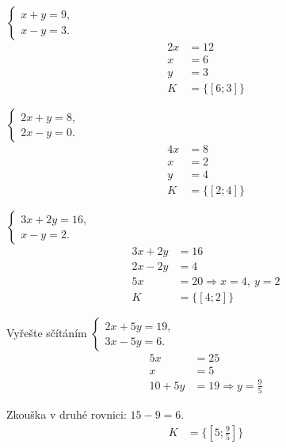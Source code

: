\documentclass[11pt,a4paper]{article}
\begin{document}
\begin{zadaniReseniBox}[title={Samostatná práce 1}]
$\begin{cases}x+y=9,\\x-y=3.\end{cases}$
\tcblower
\[
\begin{aligned}
2x&=12 \\
 x&=6 \\
 y&=3 \\[2mm]
K &= \{[6;3]\}
\end{aligned}
\]
\end{zadaniReseniBox}
\begin{zadaniReseniBox}[title={Samostatná práce 2}]
$\begin{cases}2x+y=8,\\2x-y=0.\end{cases}$
\tcblower
\[
\begin{aligned}
4x&=8 \\
 x&=2 \\
 y&=4 \\[2mm]
K &= \{[2;4]\}
\end{aligned}
\]
\end{zadaniReseniBox}
\begin{zadaniReseniBox}[title={Samostatná práce 3}]
$\begin{cases}3x+2y=16,\\x-y=2.\end{cases}$
\tcblower
\[
\begin{aligned}
3x+2y&=16 \\
 2x-2y&=4 \\
 5x&=20\Rightarrow x=4,\ y=2 \\[2mm]
K &= \{[4;2]\}
\end{aligned}
\]
\end{zadaniReseniBox}
\begin{zadaniReseniBox}[title={Samostatná práce 4}]
Vyřešte sčítáním $\begin{cases}2x+5y=19,\\3x-5y=6.\end{cases}$
\tcblower
\[
\begin{aligned}
5x&=25 \\
 x&=5 \\
 10+5y&=19\Rightarrow y=\frac95
\end{aligned}
\]

Zkouška v druhé rovnici: $15-9=6$.
\[
\begin{aligned}
K &= \{[5;\frac95]\}
\end{aligned}
\]
\end{zadaniReseniBox}
\end{document}
